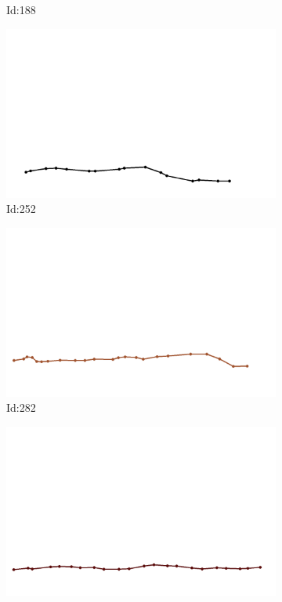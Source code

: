 \documentclass[12pt,twoside]{report}
\begin{document}
\begin{figure}
\begin{subfigure}[b]{0.20\textwidth}
\caption{Id:188}
\end{subfigure}
\begin{subfigure}[b]{0.20\textwidth}
\centering
\includegraphics[width=\textwidth]{../trajectories/252.png}
\caption{Id:252}
\end{subfigure}
\begin{subfigure}[b]{0.20\textwidth}
\centering
\includegraphics[width=\textwidth]{../trajectories/282.png}
\caption{Id:282}
\end{subfigure}
\begin{subfigure}[b]{0.20\textwidth}
\centering
\includegraphics[width=\textwidth]{../trajectories/306.png}

\end{subfigure}
\end{figure}
\end{document}
